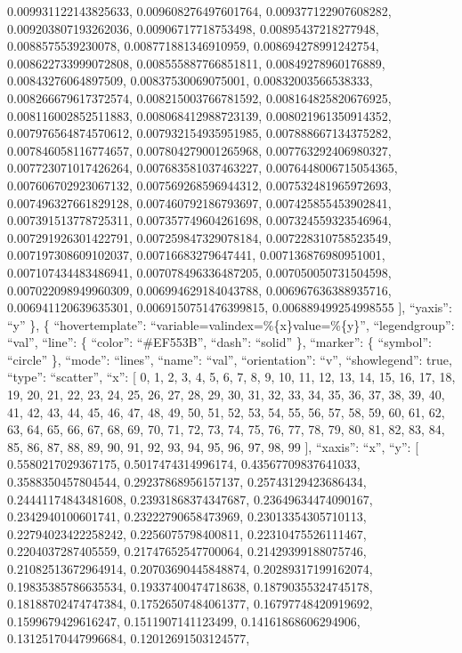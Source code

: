 \documentclass[
]{article}
\begin{document}
0.009931122143825633, 0.009608276497601764, 0.009377122907608282,
0.009203807193262036, 0.00906717718753498, 0.00895437218277948,
0.0088575539230078, 0.008771881346910959, 0.008694278991242754,
0.008622733999072808, 0.008555887766851811, 0.00849278960176889,
0.00843276064897509, 0.00837530069075001, 0.00832003566538333,
0.008266679617372574, 0.008215003766781592, 0.008164825820676925,
0.008116002852511883, 0.008068412988723139, 0.008021961350914352,
0.007976564874570612, 0.007932154935951985, 0.007888667134375282,
0.007846058116774657, 0.007804279001265968, 0.007763292406980327,
0.007723071017426264, 0.007683581037463227, 0.0076448006715054365,
0.007606702923067132, 0.007569268596944312, 0.007532481965972693,
0.007496327661829128, 0.007460792186793697, 0.007425855453902841,
0.007391513778725311, 0.007357749604261698, 0.007324559323546964,
0.007291926301422791, 0.007259847329078184, 0.007228310758523549,
0.007197308609102037, 0.00716683279647441, 0.007136876980951001,
0.007107434483486941, 0.007078496336487205, 0.007050050731504598,
0.007022098949960309, 0.006994629184043788, 0.006967636388935716,
0.006941120639635301, 0.0069150751476399815, 0.006889499254998555 {]},
``yaxis'': ``y'' \}, \{ ``hovertemplate'':
``variable=valindex=\%\{x\}value=\%\{y\}'', ``legendgroup'': ``val'',
``line'': \{ ``color'': ``\#EF553B'', ``dash'': ``solid'' \},
``marker'': \{ ``symbol'': ``circle'' \}, ``mode'': ``lines'', ``name'':
``val'', ``orientation'': ``v'', ``showlegend'': true, ``type'':
``scatter'', ``x'': {[} 0, 1, 2, 3, 4, 5, 6, 7, 8, 9, 10, 11, 12, 13,
14, 15, 16, 17, 18, 19, 20, 21, 22, 23, 24, 25, 26, 27, 28, 29, 30, 31,
32, 33, 34, 35, 36, 37, 38, 39, 40, 41, 42, 43, 44, 45, 46, 47, 48, 49,
50, 51, 52, 53, 54, 55, 56, 57, 58, 59, 60, 61, 62, 63, 64, 65, 66, 67,
68, 69, 70, 71, 72, 73, 74, 75, 76, 77, 78, 79, 80, 81, 82, 83, 84, 85,
86, 87, 88, 89, 90, 91, 92, 93, 94, 95, 96, 97, 98, 99 {]}, ``xaxis'':
``x'', ``y'': {[} 0.5580217029367175, 0.5017474314996174,
0.43567709837641033, 0.3588350457804544, 0.29237868956157137,
0.25743129423686434, 0.24441174843481608, 0.23931868374347687,
0.23649634474090167, 0.2342940100601741, 0.23222790658473969,
0.23013354305710113, 0.22794023422258242, 0.2256075798400811,
0.22310475526111467, 0.2204037287405559, 0.21747652547700064,
0.21429399188075746, 0.21082513672964914, 0.20703690445848874,
0.20289317199162074, 0.19835385786635534, 0.19337400474718638,
0.18790355324745178, 0.18188702474747384, 0.17526507484061377,
0.16797748420919692, 0.1599679429616247, 0.1511907141123499,
0.14161868606294906, 0.13125170447996684, 0.12012691503124577,
\end{document}
